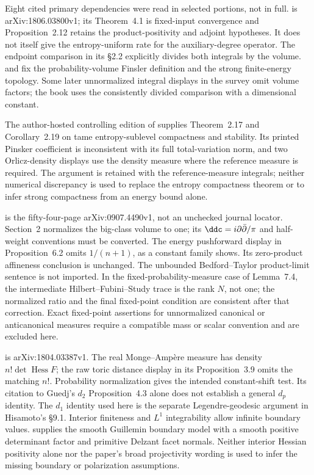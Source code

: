 Eight cited primary dependencies were read in selected portions,
not in full. \cite{DLR18QuantizationV1} is arXiv:1806.03800v1;
its Theorem~4.1 is fixed-input convergence and Proposition~2.12
retains the product-positivity and adjoint hypotheses. It does not
itself give the entropy-uniform rate for the auxiliary-degree
operator. The endpoint comparison in its \S2.2 explicitly divides
both integrals by the volume. \cite{Darvas14KahlerGeometryV2}
and \cite{Darvas21GeometrySurveyV2} fix the probability-volume
Finsler definition and the strong finite-energy topology. Some
later unnormalized integral displays in the survey omit volume
factors; the book uses the consistently divided comparison with
a dimensional constant.

The author-hosted controlling edition of
\cite{BBEGZ16TameAuthor} supplies Theorem~2.17 and Corollary~2.19
on tame entropy-sublevel compactness and stability. Its printed
Pinsker coefficient is inconsistent with its full total-variation
norm, and two Orlicz-density displays use the density measure
where the reference measure is required. The argument is retained
with the reference-measure integrals; neither numerical discrepancy
is used to replace the entropy compactness theorem or to infer
strong compactness from an energy bound alone.

\cite{BBGZ09VariationalV1} is the fifty-four-page arXiv:0907.4490v1,
not an unchecked journal locator. Section~2 normalizes the big-class
volume to one; its $\ddc=i\partial\bar\partial/\pi$ and half-weight
conventions must be converted. The energy pushforward display in
Proposition~6.2 omits $1/(n+1)$, as a constant family shows. Its
zero-product affineness conclusion is unchanged. The unbounded
Bedford--Taylor product-limit sentence is not imported. In the
fixed-probability-measure case of Lemma~7.4, the intermediate
Hilbert--Fubini--Study trace is the rank $N$, not one; the normalized
ratio and the final fixed-point condition are consistent after
that correction. Exact fixed-point assertions for unnormalized
canonical or anticanonical measures require a compatible mass or
scalar convention and are excluded here.

\cite{CGSZ18ToricV1} is arXiv:1804.03387v1. The real Monge--Amp\`ere
measure has density $n!\det\operatorname{Hess}F$; the raw toric
distance display in its Proposition~3.9 omits the matching $n!$.
Probability normalization gives the intended constant-shift test.
Its citation to Guedj's $d_2$ Proposition~4.3 alone does not establish
a general $d_p$ identity. The $d_1$ identity used here is the separate
Legendre-geodesic argument in Hisamoto's \S9.1. Interior finiteness
and $L^1$ integrability allow infinite boundary values.
\cite{Abreu00SymplecticV1} supplies the smooth Guillemin boundary
model with a smooth positive determinant factor and primitive
Delzant facet normals. Neither interior Hessian positivity alone
nor the paper's broad projectivity wording is used to infer the
missing boundary or polarization assumptions.

